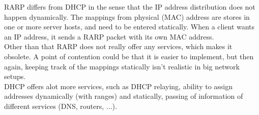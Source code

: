 RARP differs from DHCP in the sense that the IP address distribution does not happen dynamically. The mappings from physical (MAC) address are stores in one or more server hosts, and need to be entered statically. When a client wants an IP address, it sends a RARP packet with its own MAC address. \\
Other than that RARP does not really offer any services, which makes it obsolete. A point of contention could be that it is easier to implement, but then again, keeping track of the mappings statically isn't realistic in big network setups. \\
DHCP offers alot more services, such as DHCP relaying, ability to assign addresses dynamically (with ranges) and statically, passing of information of different services (DNS, routers, ...). 
